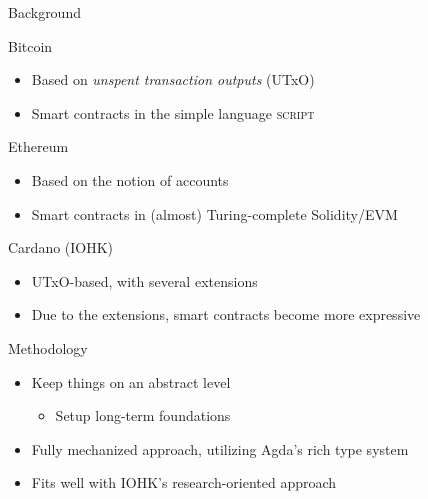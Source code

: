 \documentclass[aspectratio=43]{beamer}
\begin{document}
\begin{frame}{Background}

\begin{alertblock}{Bitcoin}
\begin{itemize}
\item Based on \textit{unspent transaction outputs} (UTxO)
\item Smart contracts in the simple language \textsc{script}
\end{itemize}
\end{alertblock}

\begin{alertblock}{Ethereum}
\begin{itemize}
\item Based on the notion of accounts
\item Smart contracts in (almost) Turing-complete Solidity/EVM
\end{itemize}
\end{alertblock}

\begin{alertblock}{Cardano (IOHK)}
\begin{itemize}
\item UTxO-based, with several extensions
\item Due to the extensions, smart contracts become more expressive
\end{itemize}
\end{alertblock}

\end{frame}

\begin{frame}{Methodology}
\begin{itemize}
\item Keep things on an abstract level
  \begin{itemize}
  \item Setup long-term foundations
  \end{itemize}
\item Fully mechanized approach, utilizing Agda's rich type system
\item Fits well with IOHK's research-oriented approach
\end{itemize}

\end{frame}
\end{document}
